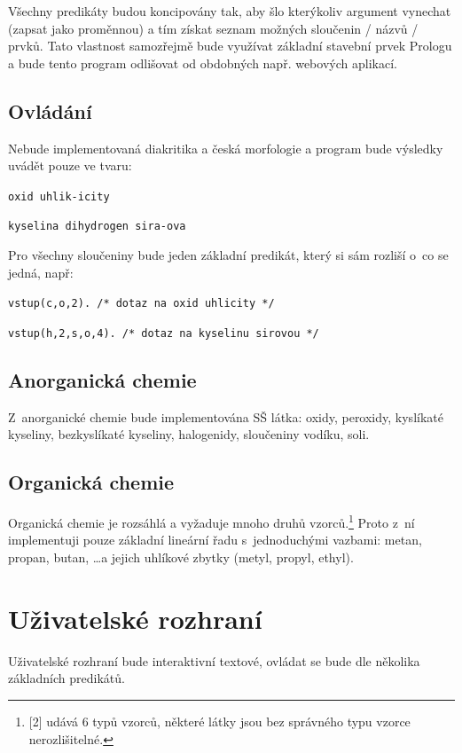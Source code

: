 \documentclass{article}
\begin{document}
Všechny predikáty budou koncipovány tak, aby šlo kterýkoliv argument
vynechat (zapsat jako proměnnou) a tím získat seznam možných
sloučenin / názvů / prvků. Tato vlastnost samozřejmě bude využívat základní
stavební prvek Prologu a bude tento program odlišovat od obdobných
např. webových aplikací. 

\subsection{Ovládání}
Nebude implementovaná diakritika a česká morfologie a program bude
výsledky uvádět pouze ve tvaru:

\texttt{oxid uhlik-icity}

\texttt{kyselina dihydrogen sira-ova}

\medskip

Pro všechny sloučeniny bude jeden základní predikát, který si sám
rozliší o~co se jedná, např:

\texttt{vstup(c,o,2).  /* dotaz na oxid uhlicity */}

\texttt{vstup(h,2,s,o,4).  /* dotaz na kyselinu sirovou */}

\subsection[Anorganická chemie]{Anorganická chemie}
Z~anorganické chemie bude implementována SŠ látka: oxidy, peroxidy,
kyslíkaté kyseliny, bezkyslíkaté kyseliny, halogenidy, sloučeniny
vodíku, soli. 

\subsection[Organická chemie]{Organická chemie}
Organická chemie je rozsáhlá a vyžaduje mnoho druhů vzorců.\footnote{[2] udává 6 typů vzorců, některé látky jsou bez správného typu vzorce nerozlišitelné.} Proto z~ní implementuji pouze základní lineární řadu s~jednoduchými vazbami: metan, propan, butan, \ldots a jejich uhlíkové zbytky (metyl, propyl, ethyl).

\section{Uživatelské rozhraní}
Uživatelské rozhraní bude interaktivní textové, ovládat se bude dle
několika základních predikátů.
\end{document}
